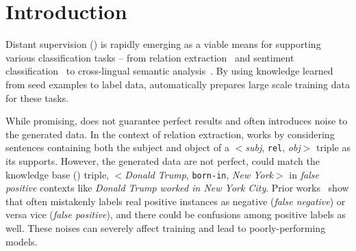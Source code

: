 \section{Introduction}

Distant supervision (\DS) is rapidly emerging as a viable means for supporting various classification tasks -- from relation extraction~\cite{mintz2009distant} and sentiment classification~\cite{go2009twitter} to cross-lingual semantic
analysis~\cite{fang2016learning}.
By using knowledge learned from seed examples to label data, \DS automatically prepares large scale training data for these tasks.




While promising, \DS does not guarantee perfect results and often introduces noise to the
generated data. In the context of relation extraction, 
\DS works by considering sentences containing both the subject and object of a $<$\emph{subj}, \texttt{rel}, \emph{obj}$>$ triple as its supports. However, the generated data are not perfect, 
\DS could match the knowledge base (\KB) triple, $<$\emph{Donald Trump},
\texttt{born-in}, \emph{New York}$>$  in \emph{false positive} contexts like \emph{Donald Trump worked in New York City}.
Prior works~\cite{takamatsu2012reducing,ritter2013modeling} show that \DS often mistakenly labels real positive instances as negative (\emph{false negative}) or
versa vice (\emph{false positive}), and there could be  confusions among positive labels as well. 
These noises can severely affect training and lead to poorly-performing models.

